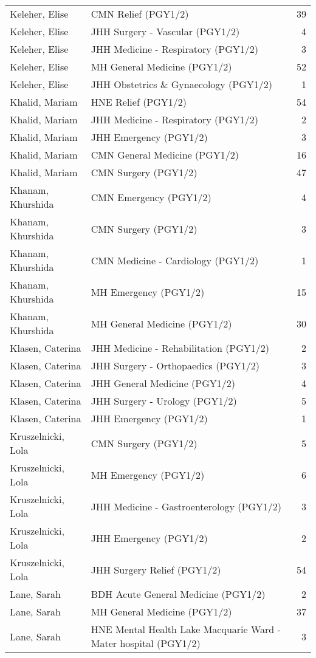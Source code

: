 \documentclass[
]{article}
\begin{document}
\begin{longtable}{llr}
Keleher, Elise & CMN Relief (PGY1/2) & 39 \\ 
Keleher, Elise & JHH Surgery - Vascular (PGY1/2) & 4 \\ 
Keleher, Elise & JHH Medicine - Respiratory (PGY1/2) & 3 \\ 
Keleher, Elise & MH General Medicine (PGY1/2) & 52 \\ 
Keleher, Elise & JHH Obstetrics \& Gynaecology (PGY1/2) & 1 \\ 
Khalid, Mariam & HNE Relief (PGY1/2) & 54 \\ 
Khalid, Mariam & JHH Medicine - Respiratory (PGY1/2) & 2 \\ 
Khalid, Mariam & JHH Emergency (PGY1/2) & 3 \\ 
Khalid, Mariam & CMN General Medicine (PGY1/2) & 16 \\ 
Khalid, Mariam & CMN Surgery (PGY1/2) & 47 \\ 
Khanam, Khurshida & CMN Emergency (PGY1/2) & 4 \\ 
Khanam, Khurshida & CMN Surgery (PGY1/2) & 3 \\ 
Khanam, Khurshida & CMN Medicine - Cardiology (PGY1/2) & 1 \\ 
Khanam, Khurshida & MH Emergency (PGY1/2) & 15 \\ 
Khanam, Khurshida & MH General Medicine (PGY1/2) & 30 \\ 
Klasen, Caterina & JHH Medicine - Rehabilitation (PGY1/2) & 2 \\ 
Klasen, Caterina & JHH Surgery - Orthopaedics (PGY1/2) & 3 \\ 
Klasen, Caterina & JHH General Medicine (PGY1/2) & 4 \\ 
Klasen, Caterina & JHH Surgery - Urology (PGY1/2) & 5 \\ 
Klasen, Caterina & JHH Emergency (PGY1/2) & 1 \\ 
Kruszelnicki, Lola & CMN Surgery (PGY1/2) & 5 \\ 
Kruszelnicki, Lola & MH Emergency (PGY1/2) & 6 \\ 
Kruszelnicki, Lola & JHH Medicine - Gastroenterology (PGY1/2) & 3 \\ 
Kruszelnicki, Lola & JHH Emergency (PGY1/2) & 2 \\ 
Kruszelnicki, Lola & JHH Surgery Relief (PGY1/2) & 54 \\ 
Lane, Sarah & BDH Acute General Medicine (PGY1/2) & 2 \\ 
Lane, Sarah & MH General Medicine (PGY1/2) & 37 \\ 
Lane, Sarah & HNE Mental Health Lake Macquarie Ward - Mater hospital (PGY1/2) & 3 \\ 

\end{longtable}
\end{document}
